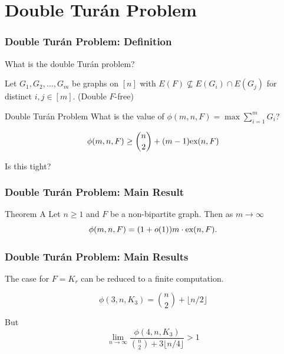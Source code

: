 \documentclass{beamer}
\newcommand*{\ex}{\textnormal{ex}}
\begin{document}
\section{Double Turán Problem}

\begin{frame}
\frametitle{Double Turán Problem: Definition}

What is the double Turán problem? \pause

\vspace{0.5cm}

Let $G_1, G_2, \ldots, G_m$ be graphs on $[n]$ with $E(F) \not\subseteq E(G_i) \cap E(G_j)$ for distinct $i, j \in [m]$. \pause (\alert{Double $F$-free})

\pause

\begin{block}{Double Turán Problem}
  What is the value of $\phi(m, n, F) = \max \sum_{i = 1}^m G_i$?
\end{block}

\pause

\[
  \phi(m, n, F) \geq \binom{n}{2} + (m - 1)\ex(n, F)
\]

\pause

Is this tight?
\end{frame}

\begin{frame}
  \frametitle{Double Turán Problem: Main Result}

  \begin{block}{Theorem A}
    Let $n \geq 1$ and $F$ be a non-bipartite graph. Then as $m \to \infty$
    \[ 
      \phi(m, n, F) = (1 + o(1))m \cdot \ex(n, F).
    \]
  \end{block}
\end{frame}

\begin{frame}
  \frametitle{Double Turán Problem: Main Results}

  The case for $F = K_r$ can be reduced to a finite computation.

  \pause

  \[
    \phi(3, n, K_3) = \binom{n}{2} + \lfloor n/2\rfloor
  \]

  \pause
  
  But 
  \[
    \lim_{n \to \infty} \frac{\phi(4, n, K_3)}{\binom{n}{2} + 3\lfloor n/4\rfloor} > 1
  \]
\end{frame}
\end{document}
